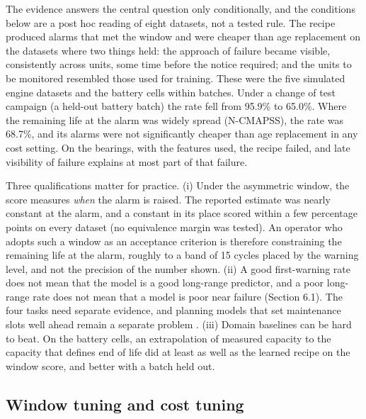 \documentclass[a4paper,fleqn,doubleblind]{cas-dc}
\begin{document}
The evidence answers the central question only conditionally, and the conditions below are a post hoc reading of eight datasets, not a tested rule. The recipe produced alarms that met the window and were cheaper than age replacement on the datasets where two things held: the approach of failure became visible, consistently across units, some time before the notice required; and the units to be monitored resembled those used for training. These were the five simulated engine datasets and the battery cells within batches. Under a change of test campaign (a held-out battery batch) the rate fell from 95.9\% to 65.0\%. Where the remaining life at the alarm was widely spread (N-CMAPSS), the rate was 68.7\%, and its alarms were not significantly cheaper than age replacement in any cost setting. On the bearings, with the features used, the recipe failed, and late visibility of failure explains at most part of that failure.

Three qualifications matter for practice. (i) Under the asymmetric window, the score measures \textit{when} the alarm is raised. The reported estimate was nearly constant at the alarm, and a constant in its place scored within a few percentage points on every dataset (no equivalence margin was tested). An operator who adopts such a window as an acceptance criterion is therefore constraining the remaining life at the alarm, roughly to a band of 15 cycles placed by the warning level, and not the precision of the number shown. (ii) A good first-warning rate does not mean that the model is a good long-range predictor, and a poor long-range rate does not mean that a model is poor near failure (Section 6.1). The four tasks need separate evidence, and planning models that set maintenance slots well ahead remain a separate problem \cite{kamariotis2024,mitici2023}. (iii) Domain baselines can be hard to beat. On the battery cells, an extrapolation of measured capacity to the capacity that defines end of life did at least as well as the learned recipe on the window score, and better with a batch held out.

\subsection{Window tuning and cost tuning}
\end{document}
